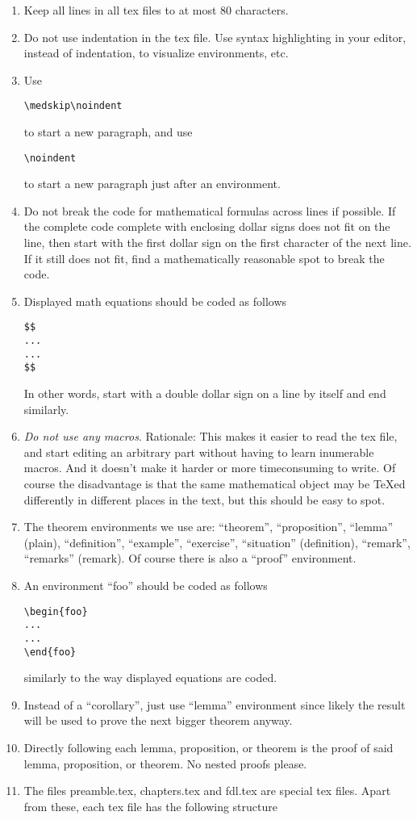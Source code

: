 \begin{enumerate}
\item Keep all lines in all tex files to at most 80 characters.
\item Do not use indentation in the tex file. Use syntax highlighting in your
editor, instead of indentation, to visualize environments, etc.
\item Use
\begin{verbatim}
\medskip\noindent
\end{verbatim}
to start a new paragraph, and use
\begin{verbatim}
\noindent
\end{verbatim}
to start a new paragraph just after an environment.
\item Do not break the code for mathematical formulas across
lines if possible. If the complete code complete with enclosing
dollar signs does not fit on the line, then start with the first
dollar sign on the first character of the next line. If it still
does not fit, find a mathematically reasonable spot to break
the code.
\item Displayed math equations should be coded as follows
\begin{verbatim}
$$
...
...
$$
\end{verbatim}
In other words, start with a double dollar sign on a line by itself
and end similarly.
\item {\it Do not use any macros}. Rationale: This makes it easier
to read the tex file, and start editing an arbitrary part
without having to learn inumerable macros.
And it doesn't make it harder or more timeconsuming to write.
Of course the disadvantage is that the same mathematical object
may be TeXed differently in different places in the text, but
this should be easy to spot.
\item The theorem environments we use are:
``theorem'', ``proposition'', ``lemma'' (plain),
``definition'', ``example'', ``exercise'', ``situation'' (definition),
``remark'', ``remarks'' (remark). Of course there is also
a ``proof'' environment.
\item An environment ``foo'' should be coded as follows
\begin{verbatim}
\begin{foo}
...
...
\end{foo}
\end{verbatim}
similarly to the way displayed equations are coded.
\item Instead of a ``corollary'', just use ``lemma'' environment
since likely the result will be used to prove the next bigger
theorem anyway.
\item Directly following each lemma, proposition, or theorem
is the proof of said lemma, proposition, or theorem. No nested
proofs please.
\item The files preamble.tex, chapters.tex and fdl.tex are special
tex files. Apart from these, each tex file
has the following structure
\begin{verbatim}



\end{verbatim}
\end{enumerate}
